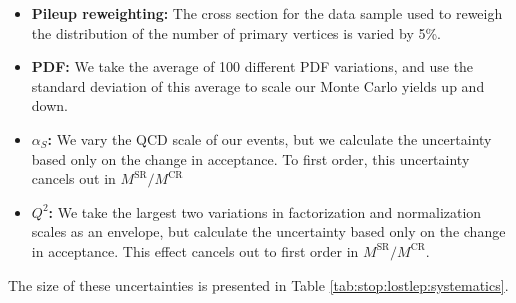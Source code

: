 \begin{itemize}
\item \textbf{Pileup reweighting:} The cross section for the data
  sample used to reweigh the distribution of the number of primary
  vertices is varied by 5\%.
\item \textbf{PDF:} We take the average of 100 different PDF
  variations, and use the standard deviation of this average to scale
  our Monte Carlo yields up and down.
\item \textbf{$\alpha_S$:} We vary the QCD scale of our events, but we
  calculate the uncertainty based only on the change in acceptance. To
  first order, this uncertainty cancels out in $M^\text{SR} / M^\text{CR}$
\item \textbf{$Q^2$:} We take the largest two variations in
  factorization and normalization scales as an envelope, but calculate
  the uncertainty based only on the change in acceptance. This effect
  cancels out to first order in $M^\text{SR} / M^\text{CR}$.
\end{itemize}
The size of these uncertainties is presented in Table
\ref{tab:stop:lostlep:systematics}.

